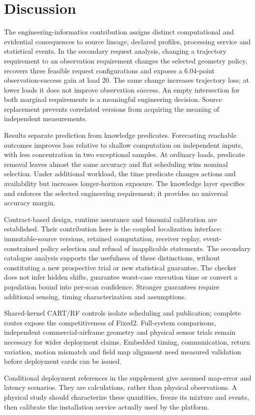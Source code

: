 
\section{Discussion}\label{sec:discussion}
The engineering-informatics contribution assigns distinct computational and evidential consequences to source lineage, declared profiles, processing service and statistical events. In the secondary request analysis, changing a trajectory requirement to an observation requirement changes the selected geometry policy, recovers three feasible request configurations and exposes a 6.04-point observation-success gain at load 20. The same change increases trajectory loss; at lower loads it does not improve observation success. An empty intersection for both marginal requirements is a meaningful engineering decision. Source replacement prevents correlated versions from acquiring the meaning of independent measurements.

Results separate prediction from knowledge predicates. Forecasting reachable outcomes improves loss relative to shallow computation on independent inputs, with less concentration in two exceptional samples. At ordinary loads, predicate removal leaves almost the same accuracy and flat scheduling wins nominal selection. Under additional workload, the time predicate changes actions and availability but increases longer-horizon exposure. The knowledge layer specifies and enforces the selected engineering requirement; it provides no universal accuracy margin.

Contract-based design, runtime assurance and binomial calibration are established. Their contribution here is the coupled localization interface: immutable-source versions, retained computation, receiver replay, event-constrained policy selection and refusal of inapplicable statements. The secondary catalogue analysis supports the usefulness of these distinctions, without constituting a new prospective trial or new statistical guarantee. The checker does not infer hidden shifts, guarantee worst-case execution time or convert a population bound into per-scan confidence. Stronger guarantees require additional sensing, timing characterization and assumptions.

Shared-kernel CART/RF controls isolate scheduling and publication; complete routes expose the competitiveness of Fixed2. Full-system comparisons, independent commercial-airframe geometry and physical sensor trials remain necessary for wider deployment claims. Embedded timing, communication, return variation, motion mismatch and field map alignment need measured validation before deployment cards can be issued.

Conditional deployment references in the supplement give assumed map-error and latency scenarios. They are calculations, rather than physical observations. A physical study should characterize these quantities, freeze its mixture and events, then calibrate the installation service actually used by the platform.
